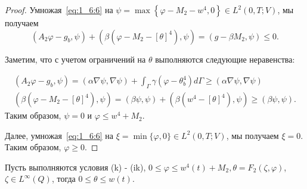\begin{proof}
    Умножая~\eqref{eq:1_6:6} на
    $\psi=\max \left\{\varphi-M_{2}-w^{4}, 0\right\} \in L^{2}(0, T ; V)$,
    мы получаем
    \[
        \left(A_{2} \varphi-g_{b}, \psi\right)+\left(\beta\left(\varphi-M_{2}
        -[\theta]^{4}\right), \psi\right)=\left(g-\beta M_{2}, \psi\right) \leq 0.
    \]

    Заметим, что с учетом ограничений на $\theta$ выполняются следующие неравенства:

    \[
        \begin{gathered}
            \left(A_{2} \varphi-g_{b}, \psi\right)=(\alpha \nabla \psi, \nabla \psi)+\int_{\Gamma}
            \gamma\left(\varphi-\theta_{b}^{4}\right) d \Gamma \geq(\alpha \nabla \psi, \nabla \psi) \\
            \left(\beta\left(\varphi-M_{2}-[\theta]^{4}\right),
            \psi\right)=(\beta \psi, \psi)+\left(\beta\left(w^{4}
            -[\theta]^{4}\right), \psi\right) \geq(\beta \psi, \psi).
        \end{gathered}
    \]
    Таким образом, $\psi=0$ и $\varphi \leq w^{4}+M_{2}$.

    Далее, умножая~\eqref{eq:1_6:6} на $\xi=\min \{\varphi, 0\} \in L^{2}(0, T ; V)$,
    мы получаем $\xi=0$.
    Таким образом, $\varphi \geq 0$.
\end{proof}

\begin{lemma}
    \label{lm:1_6:2}
    Пусть выполняются условия (k) - (ik),
    $0 \leq \varphi \leq w^{4}(t)+M_{2}, \theta=F_{2}(\zeta, \varphi)$,
    $\zeta \in L^{\infty}(Q)$, тогда $0 \leq \theta \leq w(t)$.
\end{lemma}

